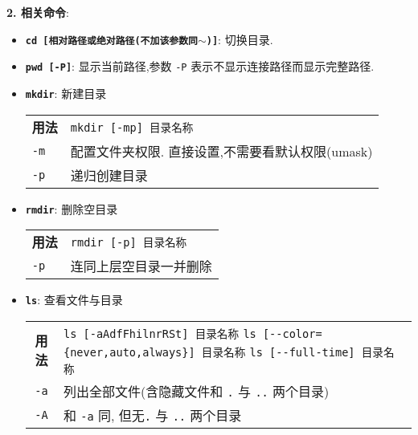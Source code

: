 \textbf{2. 相关命令}:
\begin{itemize}
\item \textbf{\texttt{cd [相对路径或绝对路径(不加该参数同$\sim$)]}}: 切换目录.

\item \textbf{\texttt{pwd [-P]}}: 显示当前路径,参数 \texttt{-P} 表示不显示连接路径而显示完整路径.

\item \textbf{\texttt{mkdir}}: 新建目录
  \begin{longtable}{l@{: }p{}}\hline\hline

    \textbf{用法} & \verb"mkdir [-mp] 目录名称"
    \\

    \texttt{-m} & 配置文件夹权限. 直接设置,不需要看默认权限(umask)  \\

     \texttt{-p}  & 递归创建目录 \\

    \hline
  \end{longtable}

\item \textbf{\texttt{rmdir}}: 删除空目录
  \begin{longtable}{l@{: }p{}}\hline\hline

    \textbf{用法} & \verb"rmdir [-p] 目录名称"\\

     \texttt{-p}  & 连同上层空目录一并删除 \\

    \hline
  \end{longtable}

\item \textbf{\texttt{ls}}: 查看文件与目录
  \begin{longtable}{c@{: }p{}}\hline\hline

    \textbf{用法} & \verb"ls [-aAdfFhilnrRSt] 目录名称" \newline
                    \verb"ls [--color={never,auto,always}] 目录名称" \newline
                    \verb"ls [--full-time] 目录名称"
    \\

    \texttt{-a} & 列出全部文件(含隐藏文件和 \texttt{.} 与 \texttt{..} 两个目录)  \\

     \texttt{-A}  &  和 \texttt{-a} 同, 但无\texttt{.} 与 \texttt{..} 两个目录  \\


\end{longtable}
\end{itemize}
